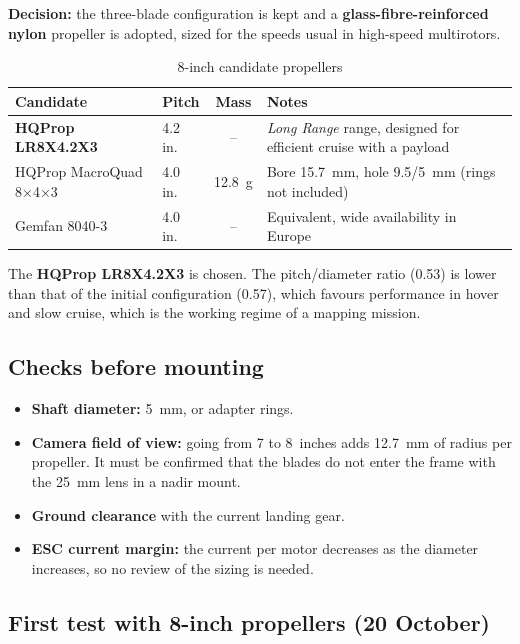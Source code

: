 \textbf{Decision:} the three-blade configuration is kept and a \textbf{glass-fibre-reinforced nylon} propeller is adopted, sized for the speeds usual in high-speed multirotors.

\begin{table}[H]
    \centering
    \caption{8-inch candidate propellers}
    \label{tab:helix-candidates}
    \small
    \begin{tabular}{llcP{6.4cm}}
        \toprule
        Candidate & Pitch & Mass & Notes \\
        \midrule
        \textbf{HQProp LR8X4.2X3} & 4.2 in. & -- & \emph{Long Range} range, designed for efficient cruise with a payload \\
        HQProp MacroQuad 8$\times$4$\times$3 & 4.0 in. & 12.8~g & Bore 15.7~mm, hole 9.5/5~mm (rings not included) \\
        Gemfan 8040-3 & 4.0 in. & -- & Equivalent, wide availability in Europe \\
        \bottomrule
    \end{tabular}
\end{table}

The \textbf{HQProp LR8X4.2X3} is chosen. The pitch/diameter ratio (0.53) is lower than that of the initial configuration (0.57), which favours performance in hover and slow cruise, which is the working regime of a mapping mission.

\subsection{Checks before mounting}
\label{subsec:propulsor-verificacions}

\begin{itemize}
    \item \textbf{Shaft diameter:} 5~mm, or adapter rings.
    \item \textbf{Camera field of view:} going from 7 to 8~inches adds 12.7~mm of radius per propeller. It must be confirmed that the blades do not enter the frame with the 25~mm lens in a nadir mount.
    \item \textbf{Ground clearance} with the current landing gear.
    \item \textbf{ESC current margin:} the current per motor decreases as the diameter increases, so no review of the sizing is needed.
\end{itemize}

\subsection{First test with 8-inch propellers (20 October)}
\label{subsec:propulsor-8in}

